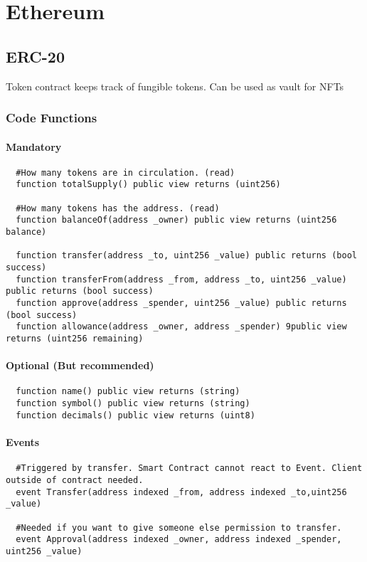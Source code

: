 \section{Ethereum}
\subsection{ERC-20}
Token contract keeps track of fungible tokens.
Can be used as vault for NFTs

\subsubsection{Code Functions}
\paragraph{Mandatory}
\begin{lstlisting}
  #How many tokens are in circulation. (read)
  function totalSupply() public view returns (uint256)

  #How many tokens has the address. (read)
  function balanceOf(address _owner) public view returns (uint256 balance)

  function transfer(address _to, uint256 _value) public returns (bool success)
  function transferFrom(address _from, address _to, uint256 _value) public returns (bool success)
  function approve(address _spender, uint256 _value) public returns (bool success)
  function allowance(address _owner, address _spender) 9public view returns (uint256 remaining)
\end{lstlisting}
\paragraph{Optional (But recommended)}
\begin{lstlisting}
  function name() public view returns (string)
  function symbol() public view returns (string)
  function decimals() public view returns (uint8)
\end{lstlisting}
\paragraph{Events}
\begin{lstlisting}
  #Triggered by transfer. Smart Contract cannot react to Event. Client outside of contract needed.
  event Transfer(address indexed _from, address indexed _to,uint256 _value)
  
  #Needed if you want to give someone else permission to transfer.
  event Approval(address indexed _owner, address indexed _spender, uint256 _value)
\end{lstlisting}

